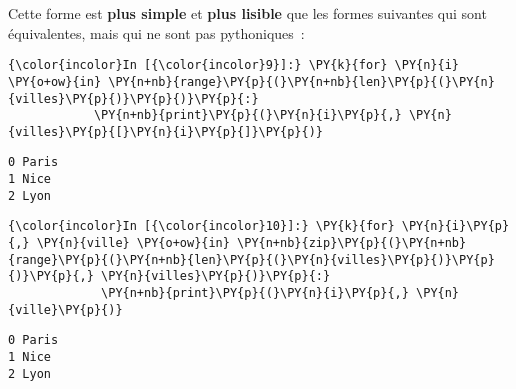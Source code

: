     Cette forme est \textbf{plus simple} et \textbf{plus lisible} que les
formes suivantes qui sont équivalentes, mais qui ne sont pas
pythoniques~:

    \begin{Verbatim}[commandchars=\\\{\}]
{\color{incolor}In [{\color{incolor}9}]:} \PY{k}{for} \PY{n}{i} \PY{o+ow}{in} \PY{n+nb}{range}\PY{p}{(}\PY{n+nb}{len}\PY{p}{(}\PY{n}{villes}\PY{p}{)}\PY{p}{)}\PY{p}{:}
            \PY{n+nb}{print}\PY{p}{(}\PY{n}{i}\PY{p}{,} \PY{n}{villes}\PY{p}{[}\PY{n}{i}\PY{p}{]}\PY{p}{)}
\end{Verbatim}


    \begin{Verbatim}[commandchars=\\\{\}]
0 Paris
1 Nice
2 Lyon

    \end{Verbatim}

    \begin{Verbatim}[commandchars=\\\{\}]
{\color{incolor}In [{\color{incolor}10}]:} \PY{k}{for} \PY{n}{i}\PY{p}{,} \PY{n}{ville} \PY{o+ow}{in} \PY{n+nb}{zip}\PY{p}{(}\PY{n+nb}{range}\PY{p}{(}\PY{n+nb}{len}\PY{p}{(}\PY{n}{villes}\PY{p}{)}\PY{p}{)}\PY{p}{,} \PY{n}{villes}\PY{p}{)}\PY{p}{:}
             \PY{n+nb}{print}\PY{p}{(}\PY{n}{i}\PY{p}{,} \PY{n}{ville}\PY{p}{)}
\end{Verbatim}


    \begin{Verbatim}[commandchars=\\\{\}]
0 Paris
1 Nice
2 Lyon

    \end{Verbatim}


    
    
    
